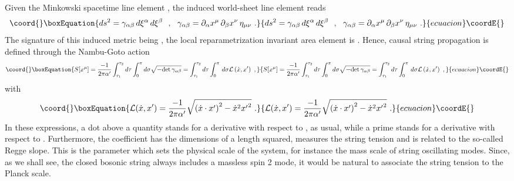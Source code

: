 \documentclass[a4paper,11pt]{article}
\begin{document}
Given the Minkowski spacetime line element \coordHE{},
the induced world-sheet line element reads
\begin{equation}\coord{}\boxEquation{
ds^2=\gamma_{\alpha\beta}\,d\xi^\alpha\,d\xi^\beta\ \ ,\ \ 
\gamma_{\alpha\beta}=\partial_\alpha x^\mu\,\partial_\beta x^\nu\,
\eta_{\mu\nu}\ .
}{
ds^2=\gamma_{\alpha\beta}\,d\xi^\alpha\,d\xi^\beta\ \ ,\ \ 
\gamma_{\alpha\beta}=\partial_\alpha x^\mu\,\partial_\beta x^\nu\,
\eta_{\mu\nu}\ .
}{ecuacion}\coordE{}\end{equation}
The signature of this induced metric \myHighlight{$\gamma_{\alpha\beta}$}\coordHE{} being \myHighlight{$(-+)$}\coordHE{},
the local reparametrization invariant area element is 
\myHighlight{$d^2\xi\,\sqrt{-{\rm det}\,\gamma_{\alpha\beta}}$}\coordHE{}. Hence, causal
string propagation is defined through the Nambu-Goto action
\begin{equation}\coord{}\boxEquation{
S[x^\mu]=\frac{-1}{2\pi\alpha'}\int_{\tau_1}^{\tau_2}d\tau\int_0^\pi
d\sigma\sqrt{-{\rm det}\,\gamma_{\alpha\beta}}=
\int_{\tau_1}^{\tau_2}d\tau\int_0^\pi\,d\sigma{\cal L}
\left(\dot{x},x'\right)\ ,
}{
S[x^\mu]=\frac{-1}{2\pi\alpha'}\int_{\tau_1}^{\tau_2}d\tau\int_0^\pi
d\sigma\sqrt{-{\rm det}\,\gamma_{\alpha\beta}}=
\int_{\tau_1}^{\tau_2}d\tau\int_0^\pi\,d\sigma{\cal L}
\left(\dot{x},x'\right)\ ,
}{ecuacion}\coordE{}\end{equation}
with
\begin{equation}\coord{}\boxEquation{
{\cal L}(\dot{x},x')=\frac{-1}{2\pi\alpha'}
\sqrt{\left(\dot{x}\cdot x'\right)^2-\dot{x}^2{x'}^2}\ .
}{
{\cal L}(\dot{x},x')=\frac{-1}{2\pi\alpha'}
\sqrt{\left(\dot{x}\cdot x'\right)^2-\dot{x}^2{x'}^2}\ .
}{ecuacion}\coordE{}\end{equation}
In these expressions, a dot above a quantity stands for a derivative
with respect to \myHighlight{$\tau$}\coordHE{}, as usual, while a prime stands for a derivative
with respect to \myHighlight{$\sigma$}\coordHE{}. Furthermore, the coefficient \coordHE{} has
the dimensions of a length squared, measures the string tension and
is related to the so-called Regge slope. This is the parameter which sets
the physical scale of the system, for instance the mass scale of string
oscillating modes. Since, as we shall see, the closed bosonic string
always includes a massless spin 2 mode, it would be natural to associate
the string tension \myHighlight{$\alpha'$}\coordHE{} to the Planck scale.

\vspace{10pt}
\end{document}
